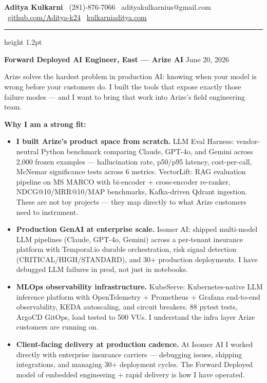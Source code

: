 \documentclass[11pt,letterpaper]{article}
\begin{document}
\thispagestyle{empty}

{\large \textbf{Aditya Kulkarni}} \hfill
{\color{ArizeViolet} \faPhone\ (281)-876-7066} \quad
{\color{ArizeViolet} \faEnvelope\ adityakulkarnius@gmail.com} \\
{\color{ArizeViolet} \faGithub\ \href{https://github.com/Aditya-k24}{github.com/Aditya-k24}} \quad
{\color{ArizeViolet} \faGlobe\ \href{https://www.kulkarniaditya.com}{kulkarniaditya.com}}

\vspace{6pt}
{\color{ArizeViolet}\hrule height 1.2pt}
\vspace{12pt}

{\color{ArizeViolet} \textbf{Forward Deployed AI Engineer, East --- Arize AI}} \hfill June 20, 2026

\vspace{10pt}

Arize solves the hardest problem in production AI: knowing when your model is wrong before your customers do. I built the tools that expose exactly those failure modes --- and I want to bring that work into Arize's field engineering team.

\vspace{6pt}

\textbf{Why I am a strong fit:}

\begin{itemize}
  \item[\faAngleRight] \textbf{I built Arize's product space from scratch.} LLM Eval Harness: vendor-neutral Python benchmark comparing Claude, GPT-4o, and Gemini across 2,000 frozen examples --- hallucination rate, p50/p95 latency, cost-per-call, McNemar significance tests across 6 metrics. VectorLift: RAG evaluation pipeline on MS MARCO with bi-encoder + cross-encoder re-ranker, NDCG@10/MRR@10/MAP benchmarks, Kafka-driven Qdrant ingestion. These are not toy projects --- they map directly to what Arize customers need to instrument.

  \item[\faAngleRight] \textbf{Production GenAI at enterprise scale.} Isomer AI: shipped multi-model LLM pipelines (Claude, GPT-4o, Gemini) across a per-tenant insurance platform with Temporal.io durable orchestration, risk signal detection (CRITICAL/HIGH/STANDARD), and 30+ production deployments. I have debugged LLM failures in prod, not just in notebooks.

  \item[\faAngleRight] \textbf{MLOps observability infrastructure.} KubeServe: Kubernetes-native LLM inference platform with OpenTelemetry + Prometheus + Grafana end-to-end observability, KEDA autoscaling, and circuit breakers. 88 pytest tests, ArgoCD GitOps, load tested to 500 VUs. I understand the infra layer Arize customers are running on.

  \item[\faAngleRight] \textbf{Client-facing delivery at production cadence.} At Isomer AI I worked directly with enterprise insurance carriers --- debugging issues, shipping integrations, and managing 30+ deployment cycles. The Forward Deployed model of embedded engineering + rapid delivery is how I have operated.
\end{itemize}
\end{document}
